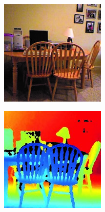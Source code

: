 \begin{figure}[h!]
	\centering
	\captionsetup{width=\linewidth}
	\begin{subfigure}[b]{0.24\linewidth}
		\includegraphics[width=\linewidth]{./Figures/nyu_depth_v2_img.jpg}
		\caption{}
	\end{subfigure}
	\begin{subfigure}[b]{0.24\linewidth}
	\includegraphics[width=\linewidth]{./Figures/nyu_depth_v2_depth.jpg}

\end{subfigure}
\end{figure}
